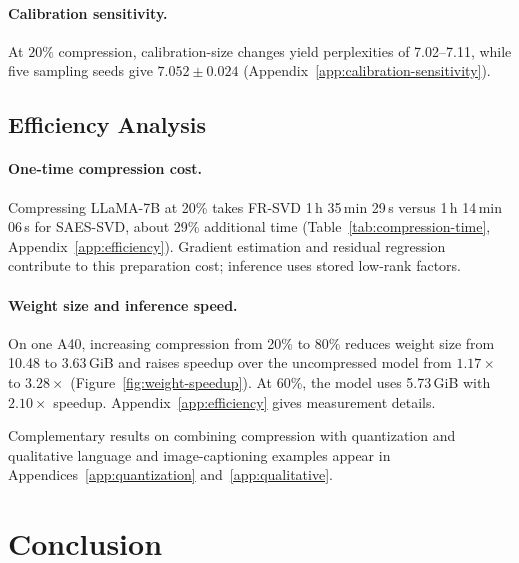\documentclass[11pt]{article}
\begin{document}


\paragraph{Calibration sensitivity.}
At $20\%$ compression, calibration-size changes yield perplexities of 7.02--7.11, while five sampling seeds give $7.052\pm0.024$ (Appendix~\ref{app:calibration-sensitivity}).

\subsection{Efficiency Analysis}\label{sec:efficiency}

\paragraph{One-time compression cost.}
Compressing LLaMA-7B at 20\% takes FR-SVD 1\,h 35\,min 29\,s versus 1\,h 14\,min 06\,s for SAES-SVD, about 29\% additional time (Table~\ref{tab:compression-time}, Appendix~\ref{app:efficiency}). Gradient estimation and residual regression contribute to this preparation cost; inference uses stored low-rank factors.

\paragraph{Weight size and inference speed.}
On one A40, increasing compression from 20\% to 80\% reduces weight size from 10.48 to 3.63\,GiB and raises speedup over the uncompressed model from $1.17\times$ to $3.28\times$ (Figure~\ref{fig:weight-speedup}). At 60\%, the model uses 5.73\,GiB with $2.10\times$ speedup. Appendix~\ref{app:efficiency} gives measurement details.



Complementary results on combining compression with quantization and qualitative language and image-captioning examples appear in Appendices~\ref{app:quantization} and~\ref{app:qualitative}.

\section{Conclusion}\label{sec:conclusion}
\end{document}
